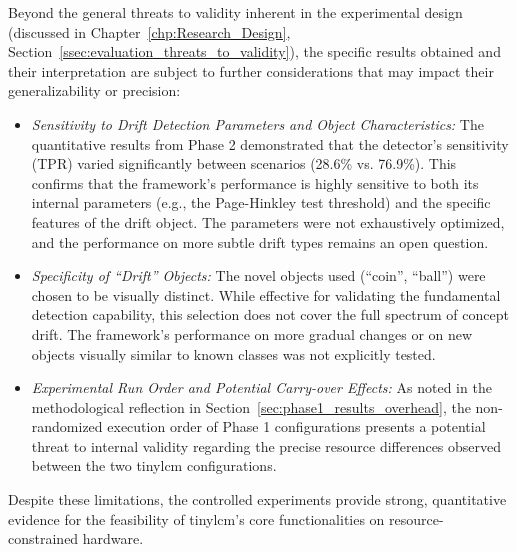 Beyond the general threats to validity inherent in the experimental design (discussed in Chapter~\ref{chp:Research_Design}, Section~\ref{ssec:evaluation_threats_to_validity}), the specific results obtained and their interpretation are subject to further considerations that may impact their generalizability or precision:

\begin{itemize}[noitemsep, topsep=0pt]
    \item \textit{Sensitivity to Drift Detection Parameters and Object Characteristics:} The quantitative results from Phase 2 demonstrated that the detector's sensitivity (TPR) varied significantly between scenarios (28.6\% vs. 76.9\%). This confirms that the framework's performance is highly sensitive to both its internal parameters (e.g., the Page-Hinkley test threshold) and the specific features of the drift object. The parameters were not exhaustively optimized, and the performance on more subtle drift types remains an open question.

    \item \textit{Specificity of ``Drift'' Objects:} The novel objects used (``coin'', ``ball'') were chosen to be visually distinct. While effective for validating the fundamental detection capability, this selection does not cover the full spectrum of concept drift. The framework's performance on more gradual changes or on new objects visually similar to known classes was not explicitly tested.

    \item \textit{Experimental Run Order and Potential Carry-over Effects:} As noted in the methodological reflection in Section~\ref{sec:phase1_results_overhead}, the non-randomized execution order of Phase 1 configurations presents a potential threat to internal validity regarding the precise resource differences observed between the two \gls{tinylcm} configurations.
\end{itemize}
Despite these limitations, the controlled experiments provide strong, quantitative evidence for the feasibility of \gls{tinylcm}'s core functionalities on resource-constrained hardware.

